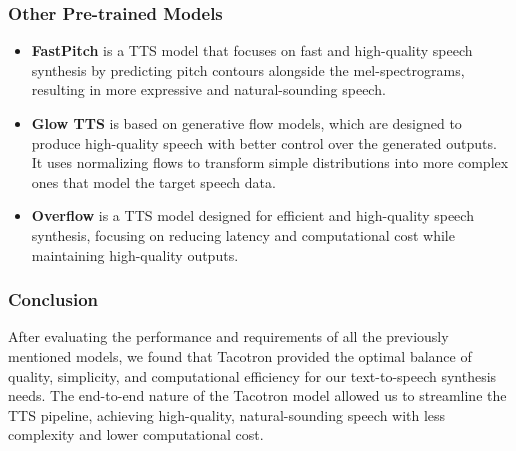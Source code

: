 \subsubsection{Other Pre-trained Models}

\begin{itemize}
    \item \textbf{FastPitch} 
    is a TTS model that focuses on fast and high-quality speech synthesis by predicting pitch contours alongside the mel-spectrograms, resulting in more expressive and natural-sounding speech.
    
    \item \textbf{Glow TTS}
     is based on generative flow models, which are designed to produce high-quality speech with better control over the generated outputs. It uses normalizing flows to transform simple distributions into more complex ones that model the target speech data.

    \item \textbf{Overflow}
    is a TTS model designed for efficient and high-quality speech synthesis, focusing on reducing latency and computational cost while maintaining high-quality outputs.
\end{itemize}


\subsubsection{Conclusion}

After evaluating the performance and requirements of all the previously mentioned models, we found that Tacotron provided the optimal balance of quality, simplicity, and computational efficiency for our text-to-speech synthesis needs. The end-to-end nature of the Tacotron model allowed us to streamline the TTS pipeline, achieving high-quality, natural-sounding speech with less complexity and lower computational cost.


